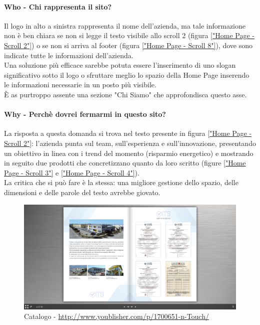 \paragraph{Who - Chi rappresenta il sito?}
Il logo in alto a sinistra rappresenta il nome dell'azienda, ma tale informazione non è ben chiara se non si legge il testo visibile allo scroll 2 (figura \ref{"Home Page - Scroll 2"}) o se non si arriva al footer (figura \ref{"Home Page - Scroll 8"}), dove sono indicate tutte le informazioni dell'azienda.\\
Una soluzione più efficace sarebbe potuta essere l'inserimento di uno slogan significativo sotto il logo o sfruttare meglio lo spazio della Home Page inserendo le informazioni necessarie in un posto più visibile. \\
È as purtroppo assente una sezione "Chi Siamo" che approfondisca questo asse.
\paragraph{Why - Perchè dovrei fermarmi in questo sito?}
La risposta a questa domanda si trova nel testo presente in figura \ref{"Home Page - Scroll 2"}: l'azienda punta sul team, sull'esperienza e sull'innovazione, presentando un obiettivo in linea con i trend del momento (risparmio energetico) e mostrando in seguito due prodotti che concretizzano quanto da loro scritto (figure \ref{"Home Page - Scroll 3"} e \ref{"Home Page - Scroll 4"}). \\
La critica che si può fare è la stessa: una migliore gestione dello spazio, delle dimensioni e delle parole del testo avrebbe giovato. 

\begin{figure}[H]
\centering
\includegraphics[width=1\textwidth]{img/Catalogo}
\caption{Catalogo - \url{http://www.youblisher.com/p/1700651-n-Touch/} \label{Catalogo}}
\end{figure}


